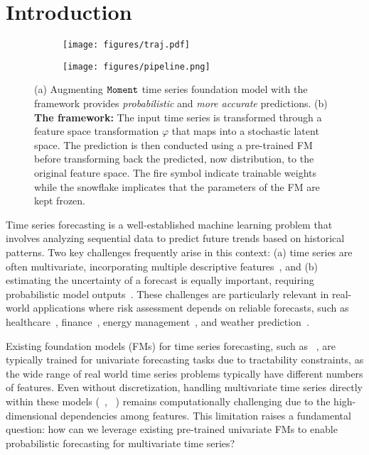 \section{Introduction}
\label{sec:intro}

\begin{figure}[t]
     \centering
     \begin{subfigure}[b]{\columnwidth}
         \centering
        \texttt{[image: figures/traj.pdf]}
         \caption{}
         \label{fig:traj}
     \end{subfigure}
     \vfill
     \begin{subfigure}[b]{\columnwidth}
         \centering
        \texttt{[image: figures/pipeline.png]}
         \caption{}
         \label{fig:pipeline}
     \end{subfigure}
\caption{(a) Augmenting $\texttt{Moment}$ time series foundation model with the \adapts framework provides \emph{probabilistic} and \emph{more accurate} predictions. (b) \textbf{The \adapts framework:} The input time series is transformed through a feature space transformation $\varphi$ that maps into a stochastic latent space. The prediction is then conducted using a pre-trained FM before transforming back the predicted, now distribution, to the original feature space. The fire symbol indicate trainable weights while the snowflake implicates that the parameters of the FM are kept frozen.
}
\label{fig:main}
\end{figure}

Time series forecasting is a well-established machine learning problem that involves analyzing sequential data to predict future trends based on historical patterns. Two key challenges frequently arise in this context: (a) time series are often multivariate, incorporating multiple descriptive features~\citep{wei2019multivariate}, and (b) estimating the uncertainty of a forecast is equally important, requiring probabilistic model outputs~\citep{gneiting2014probabilistic}. These challenges are particularly relevant in real-world applications where risk assessment depends on reliable forecasts, such as healthcare~\citep{jones2012improved}, finance~\citep{groen2013real}, energy management~\citep{zhang2014review,nowotarski2018recent}, and weather prediction~\citep{palmer2012towards,bi2023accurate}.  

Existing foundation models (FMs) for time series forecasting, such as \chronos~\citep{ansari2024chronos}, are typically trained for univariate forecasting tasks due to tractability constraints, as the wide range of real world time series problems typically have different numbers of features. Even without discretization, handling multivariate time series directly within these models (\moment~\citep{goswami2024moment}, \moirai~\citep{liu2024moirai}) remains computationally challenging due to the high-dimensional dependencies among features. This limitation raises a fundamental question: how can we leverage existing pre-trained univariate FMs to enable probabilistic forecasting for multivariate time series?  


